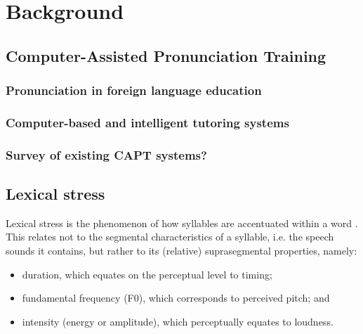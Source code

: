 %
%
\chapter{Background%
}
\label{chap:background}





\section{Computer-Assisted Pronunciation Training} %



	\subsection{Pronunciation in foreign language education}


	\subsection{Computer-based and intelligent tutoring systems} 
	
	\subsection{Survey of existing CAPT systems?}
	
 \section{Lexical stress}
			Lexical stress is the phenomenon of how syllables are accentuated within a word  \citep{Cutler2005}. This relates not to the segmental characteristics of a syllable, i.e. the speech sounds it contains, but rather to its (relative) suprasegmental properties, namely: %
			\begin{itemize}
			\item duration, which equates on the perceptual level to timing;
			\item fundamental frequency (F0), which corresponds to perceived pitch; and
			\item intensity (energy or amplitude), which perceptually equates to loudness.
			\end{itemize}

